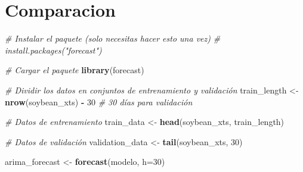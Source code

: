 \documentclass[
]{book}
\newenvironment{Shaded}{\begin{snugshade}}{\end{snugshade}}
\newcommand{\AttributeTok}[1]{\textcolor[rgb]{0.13,0.29,0.53}{#1}}
\newcommand{\CommentTok}[1]{\textcolor[rgb]{0.56,0.35,0.01}{\textit{#1}}}
\newcommand{\DecValTok}[1]{\textcolor[rgb]{0.00,0.00,0.81}{#1}}
\newcommand{\FunctionTok}[1]{\textcolor[rgb]{0.13,0.29,0.53}{\textbf{#1}}}
\newcommand{\NormalTok}[1]{#1}
\newcommand{\OtherTok}[1]{\textcolor[rgb]{0.56,0.35,0.01}{#1}}
\newcommand{\SpecialCharTok}[1]{\textcolor[rgb]{0.81,0.36,0.00}{\textbf{#1}}}
\begin{document}
\hypertarget{comparacion}{%
\chapter{Comparacion}\label{comparacion}}

\begin{Shaded}
\begin{Highlighting}[]
\CommentTok{\# Instalar el paquete (solo necesitas hacer esto una vez)}
\CommentTok{\# install.packages("forecast")}

\CommentTok{\# Cargar el paquete}
\FunctionTok{library}\NormalTok{(forecast)}
\end{Highlighting}
\end{Shaded}

\begin{Shaded}
\begin{Highlighting}[]
\CommentTok{\# Dividir los datos en conjuntos de entrenamiento y validación}
\NormalTok{train\_length }\OtherTok{\textless{}{-}} \FunctionTok{nrow}\NormalTok{(soybean\_xts) }\SpecialCharTok{{-}} \DecValTok{30}  \CommentTok{\# 30 días para validación}

\CommentTok{\# Datos de entrenamiento}
\NormalTok{train\_data }\OtherTok{\textless{}{-}} \FunctionTok{head}\NormalTok{(soybean\_xts, train\_length)}

\CommentTok{\# Datos de validación}
\NormalTok{validation\_data }\OtherTok{\textless{}{-}} \FunctionTok{tail}\NormalTok{(soybean\_xts, }\DecValTok{30}\NormalTok{)}
\end{Highlighting}
\end{Shaded}

\begin{Shaded}
\begin{Highlighting}[]
\NormalTok{arima\_forecast }\OtherTok{\textless{}{-}} \FunctionTok{forecast}\NormalTok{(modelo, }\AttributeTok{h=}\DecValTok{30}\NormalTok{)}
\end{Highlighting}
\end{Shaded}

\begin{Shaded}
\end{Shaded}
\end{document}

